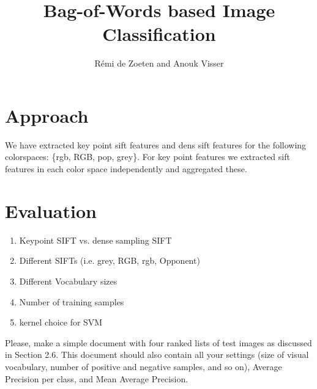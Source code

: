 \documentclass[11pt]{article}
\title{Bag-of-Words based Image Classification}
\author{R\'emi de Zoeten and Anouk Visser}
\begin{document}
\maketitle
\section{Approach}
We have extracted key point sift features and dens sift features for the following colorspaces: \{rgb, RGB, pop, grey\}. For key point features we extracted sift features in each color space independently and aggregated these.

\section{Evaluation}
\begin{enumerate}
\item Keypoint SIFT vs. dense sampling SIFT
\item Different SIFTs (i.e. grey, RGB, rgb, Opponent)
\item Different Vocabulary sizes
\item Number of training samples
\item kernel choice for SVM
\end{enumerate}

Please, make a simple document with four ranked lists of test images as discussed in Section 2.6. This document should also contain all your settings (size of visual vocabulary, number of positive and negative samples, and so on), Average Precision per class, and Mean Average Precision.
\end{document}
